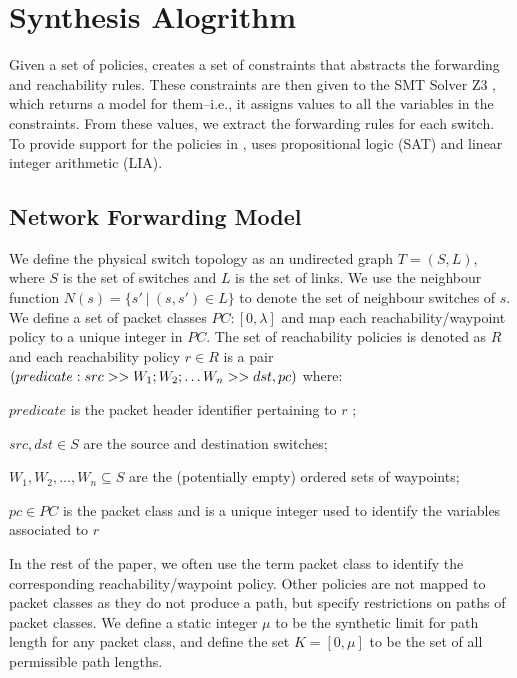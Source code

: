 \section{Synthesis Alogrithm}
Given a set of policies, \Name creates a set of constraints 
that abstracts the forwarding and reachability rules. 
These constraints are then given to the SMT Solver Z3 \cite{z3}, which returns a model 
for them--i.e., it assigns values to all the variables in the constraints. From these values, we extract the forwarding rules for each switch.
To provide support for the policies in , \name uses propositional logic (SAT) and linear integer arithmetic (LIA).
\subsection{Network Forwarding Model} \label{sec:fwdmodel}
We define the physical switch topology as an undirected graph $T=(S, L)$,
where $S$ is the set of switches and $L$ is the set of links. 
We use the neighbour function $N(s) = \{s'\ | \ (s,s') \in L \}$ to denote 
the set of neighbour switches of $s$. 
We define a set of packet classes $PC : [0,\lambda]$ and map each reachability/waypoint policy to a unique integer in $PC$.
The set of reachability policies is denoted as $R$ and each reachability policy $r \in R$ is
a pair
$(predicate :\newline src >> W_1;W_2; \ldots W_n >> dst, pc)$
where:
\begin{compactitemize}
\item  $predicate$ is the packet header identifier pertaining to $r$ ;
\item  $src,dst \in S$ are the source and destination switches;
\item $W_1, W_2, \ldots, W_n \subseteq S$ are the (potentially empty) ordered sets of waypoints; 
\item $pc \in PC$ is the packet class and is a unique integer used to identify the variables associated to $r$
\end{compactitemize} 
In the rest of the paper, we often use the term packet class to identify the corresponding reachability/waypoint policy. 
Other policies are not mapped to packet classes as they do not produce a path, but specify restrictions on paths of packet classes. 
We define a static integer $\mu$ to be the synthetic limit for path length for any packet class, and define the set $K = [0, \mu]$ to be the set of all permissible path lengths.

